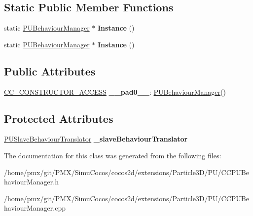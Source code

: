 \subsection*{Static Public Member Functions}
\begin{DoxyCompactItemize}
\item 
\mbox{\label{classPUBehaviourManager_ad1f58ed146935d989e10e347903d9366}} 
static \hyperlink{classPUBehaviourManager}{P\+U\+Behaviour\+Manager} $\ast$ {\bfseries Instance} ()
\item 
\mbox{\label{classPUBehaviourManager_a033245be80d8c4ca0ecfe20480caddd6}} 
static \hyperlink{classPUBehaviourManager}{P\+U\+Behaviour\+Manager} $\ast$ {\bfseries Instance} ()
\end{DoxyCompactItemize}
\subsection*{Public Attributes}
\begin{DoxyCompactItemize}
\item 
\mbox{\label{classPUBehaviourManager_afb87af4e98fd2be9c6eb6cc0ca4c26dc}} 
\hyperlink{_2cocos2d_2cocos_2base_2ccConfig_8h_a25ef1314f97c35a2ed3d029b0ead6da0}{C\+C\+\_\+\+C\+O\+N\+S\+T\+R\+U\+C\+T\+O\+R\+\_\+\+A\+C\+C\+E\+SS} {\bfseries \+\_\+\+\_\+pad0\+\_\+\+\_\+}\+: \hyperlink{classPUBehaviourManager}{P\+U\+Behaviour\+Manager}()
\end{DoxyCompactItemize}
\subsection*{Protected Attributes}
\begin{DoxyCompactItemize}
\item 
\mbox{\label{classPUBehaviourManager_ac2307c181e2a49d7aa2c4c0dfef55acd}} 
\hyperlink{classPUSlaveBehaviourTranslator}{P\+U\+Slave\+Behaviour\+Translator} {\bfseries \+\_\+slave\+Behaviour\+Translator}
\end{DoxyCompactItemize}


The documentation for this class was generated from the following files\+:\begin{DoxyCompactItemize}
\item 
/home/pmx/git/\+P\+M\+X/\+Simu\+Cocos/cocos2d/extensions/\+Particle3\+D/\+P\+U/C\+C\+P\+U\+Behaviour\+Manager.\+h\item 
/home/pmx/git/\+P\+M\+X/\+Simu\+Cocos/cocos2d/extensions/\+Particle3\+D/\+P\+U/C\+C\+P\+U\+Behaviour\+Manager.\+cpp\end{DoxyCompactItemize}
